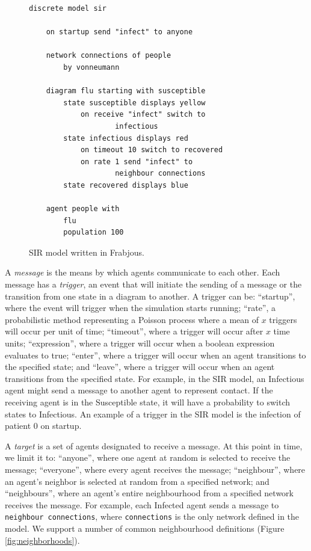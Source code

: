 \documentclass{sig-alternate}
\begin{document}
\begin{figure}[!b]
\begin{center}
\begin{lstlisting}
discrete model sir

    on startup send "infect" to anyone
	
    network connections of people
    	by vonneumann
	
    diagram flu starting with susceptible
        state susceptible displays yellow
            on receive "infect" switch to
            		infectious
        state infectious displays red
            on timeout 10 switch to recovered
            on rate 1 send "infect" to 
            		neighbour connections
        state recovered displays blue

    agent people with
        flu
        population 100
\end{lstlisting}
\caption{SIR model written in Frabjous.}
\label{sir_frabjous}
\end{center}
\end{figure}


A \emph{message} is the means by which agents communicate to each other. Each message has a \emph{trigger}, an event that will initiate the sending of a message or the transition from one state in a diagram to another. A trigger can be: ``startup'', where the event will trigger when the simulation starts running; ``rate'', a probabilistic method representing a Poisson process where a mean of $x$ triggers will occur per unit of time; ``timeout'', where a trigger will occur after $x$ time units; ``expression'', where a trigger will occur when a boolean expression evaluates to true; ``enter'', where a trigger will occur when an agent transitions to the specified state; and ``leave'', where a trigger will occur when an agent transitions from the specified state.  For example, in the SIR model, an Infectious agent might send a message to another agent to represent contact. If the receiving agent is in the Susceptible state, it will have a probability to switch states to Infectious. An example of a trigger in the SIR model is the infection of patient 0 on startup.

A \emph{target} is a set of agents designated to receive a message. At this point in time, we limit it to: ``anyone'', where one agent at random is selected to receive the message; ``everyone'', where every agent receives the message; ``neighbour'', where an agent's neighbor is selected at random from a specified network; and ``neighbours'', where an agent's entire neighbourhood from a specified network receives the message.  For example, each Infected agent sends a message to {\tt neighbour connections}, where {\tt connections} is the only network defined in the model. We support a number of common neighbourhood definitions (Figure \ref{fig:neighborhoods}).
\end{document}
